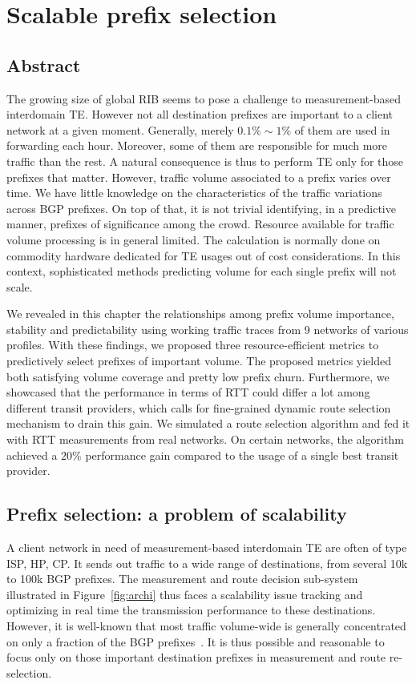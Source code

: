 \chapter{Scalable prefix selection}
\label{sec:pref_selec}

\section*{Abstract}
The growing size of global \acf{RIB} seems to pose a challenge to measurement-based interdomain \acf{TE}. However not all destination prefixes are important to a client network at a given moment. 
Generally, merely $0.1\% \sim 1\%$ of them are used in forwarding each hour. 
Moreover, some of them are responsible for much more traffic than the rest.
A natural consequence is thus to perform TE only for those prefixes that matter.
However, traffic volume associated to a prefix varies over time. 
We have little knowledge on the characteristics of the traffic variations across \acf{BGP} prefixes.
On top of that, it is not trivial identifying, in a predictive manner, prefixes of significance among the crowd.
Resource available for traffic volume processing is in general limited.
The calculation is normally done on commodity hardware dedicated for \ac{TE} usages out of cost considerations.
In this context, sophisticated methods predicting volume for each single prefix will not scale.

We revealed in this chapter the relationships among prefix volume importance, stability and predictability using working traffic traces from 9 networks of various profiles. 
With these findings, we proposed three resource-efficient metrics to predictively select prefixes of important volume. 
The proposed metrics yielded both satisfying volume coverage and pretty low prefix churn. 
Furthermore, we showcased that the performance in terms of RTT could differ a lot among different transit providers, which calls for fine-grained dynamic route selection mechanism to drain this gain. 
We simulated a route selection algorithm and fed it with RTT measurements from real networks.
On certain networks, the algorithm achieved a $20\%$ performance gain compared to the usage of a single best transit provider.
\clearpage

\section{Prefix selection: a problem of scalability}
A client network in need of measurement-based interdomain \acf{TE} are often of type \acf{ISP}, \acf{HP}, \acf{CP}.
It sends out traffic to a wide range of destinations, from several 10k to 100k BGP prefixes.
The measurement and route decision sub-system illustrated in Figure~\ref{fig:archi} thus faces a scalability issue tracking and optimizing in real time the transmission performance to these destinations.
However, it is well-known that most traffic volume-wide is generally concentrated on only a fraction of the BGP prefixes~\cite{Fang1999, Feamster2003, Papagiannaki2005, Sarrar2012}.
It is thus possible and reasonable to focus only on those important destination prefixes in measurement and route re-selection. 

